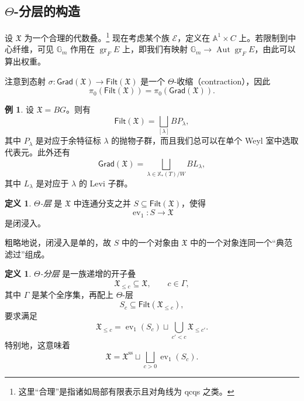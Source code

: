 \documentclass{amsart}
\theoremstyle{definition}
\newtheorem{defn}[thm]{定义}
\newtheorem{exm}[thm]{例}
\theoremstyle{remark}
\theoremstyle{plain}
\theoremstyle{definition}
\theoremstyle{remark}
\newcommand{\A}{\mathbb{A}}
\newcommand{\G}{\mathbb{G}}
\newcommand{\mc}[1]{\mathcal{#1}}
\newcommand{\mf}[1]{\mathfrak{#1}}
\newcommand{\mr}[1]{\mathrm{#1}}
\newcommand{\on}[1]{\operatorname{#1}}
\newcommand{\ms}[1]{\mathsf{#1}}
\newcommand{\1}{\mathbf{1}}
\newcommand{\2}{\mathbf{2}}
\newcommand{\3}{\mathbf{3}}
\DeclareMathOperator{\Aut}{Aut}
\DeclareMathOperator{\ev}{ev}
\begin{document}
\subsection{\(\Theta\)-分层的构造}%
\label{sub:Construction of Theta-stratifications}

设 \(\mf{X}\) 为一个合理的代数叠。\footnote{这里“合理”是指诸如局部有限表示且对角线为 qcqs 之类。} 现在考虑某个族 \(\mc{E}\)，定义在 \(\A^1 \times C\) 上。若限制到中心纤维，可见 \(\G_m\) 作用在 \(\on{gr}_F E\) 上，即我们有映射 \(\G_m \to \Aut \on{gr}_F E\)，由此可以算出权重。

注意到态射 \(\sigma \colon \ms{Grad}(\mf{X}) \to \ms{Filt}(\mf{X})\) 是一个 \(\Theta\)-收缩（contraction），因此
\[ \pi_0(\ms{Filt}(\mf{X})) = \pi_0(\ms{Grad}(\mf{X})). \]

\begin{exm}
    设 \(\mf{X} = BG\)。则有
    \[\ms{Filt}(\mf{X}) = \bigsqcup_{[\lambda]} B P_{\lambda}, \]
    其中 \(P_{\lambda}\) 是对应于余特征标 \(\lambda\) 的抛物子群，而且我们总可以在单个 Weyl 室中选取代表元。此外还有
    \[ \ms{Grad}(\mf{X}) = \bigsqcup_{\lambda \in \mathbb{X}_*(T)/W} B L_{\lambda}, \]
    其中 \(L_{\lambda}\) 是对应于 \(\lambda\) 的 Levi 子群。
\end{exm}

\begin{defn}
    \textit{\(\Theta\)-层} 是 \(\mf{X}\) 中连通分支之并 \(S \subseteq \ms{Filt}(\mf{X})\)，使得
    \[ \ev_1 \colon S \to \mf{X} \]
    是闭浸入。
\end{defn}

粗略地说，闭浸入是单的，故 \(S\) 中的一个对象由 \(\mf{X}\) 中的一个对象连同一个“典范滤过”组成。

\begin{defn}
    \textit{\(\Theta\)-分层} 是一族递增的开子叠
    \[ \mf{X}_{\leq c} \subseteq \mf{X}, \qquad c \in \Gamma, \]
    其中 \(\Gamma\) 是某个全序集，再配上 \(\Theta\)-层
    \[ S_c \subseteq \ms{Filt}(\mf{X}_{\leq c}), \]
    要求满足
    \[ \mf{X}_{\leq c} = \ev_1(S_c) \sqcup \bigcup_{c' < c} \mf{X}_{\leq c'}. \]
    特别地，这意味着
    \[ \mf{X} = \mf{X}^{\mr{ss}} \sqcup \bigsqcup_{c > 0} \ev_1(S_c). \]
\end{defn}
\end{document}
